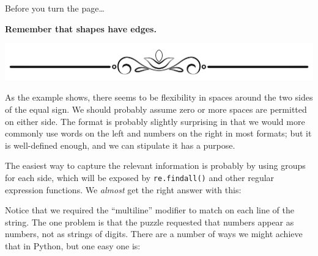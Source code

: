 Before you turn the page\ldots{}

\textbf{Remember that shapes have edges.}

\includegraphics{images/Elegant-Flourish-Frame-Extrapolated-19.svg}

\newpage

As the example shows, there seems to be flexibility in spaces around the
two sides of the equal sign. We should probably assume zero or more
spaces are permitted on either side. The format is probably slightly
surprising in that we would more commonly use words on the left and
numbers on the right in most formats; but it is well-defined enough, and
we can stipulate it has a purpose.

The easiest way to capture the relevant information is probably by using
groups for each side, which will be exposed by \texttt{re.findall()} and
other regular expression functions. We \emph{almost} get the right
answer with this:

\begin{Shaded}
\begin{Highlighting}[]
\OperatorTok{\textgreater{}\textgreater{}\textgreater{}} 
\NormalTok{\{}\StringTok{\textquotesingle{}3\textquotesingle{}}\NormalTok{: }\NormalTok{, }\StringTok{\textquotesingle{}14\textquotesingle{}}\NormalTok{: }\NormalTok{, }\StringTok{\textquotesingle{}9\textquotesingle{}}\NormalTok{: }\NormalTok{,}
\StringTok{\textquotesingle{}21\textquotesingle{}}\NormalTok{: }\NormalTok{\}}
\end{Highlighting}
\end{Shaded}

Notice that we required the ``multiline'' modifier to match on each line
of the string. The one problem is that the puzzle requested that numbers
appear as numbers, not as strings of digits. There are a number of ways
we might achieve that in Python, but one easy one is:

